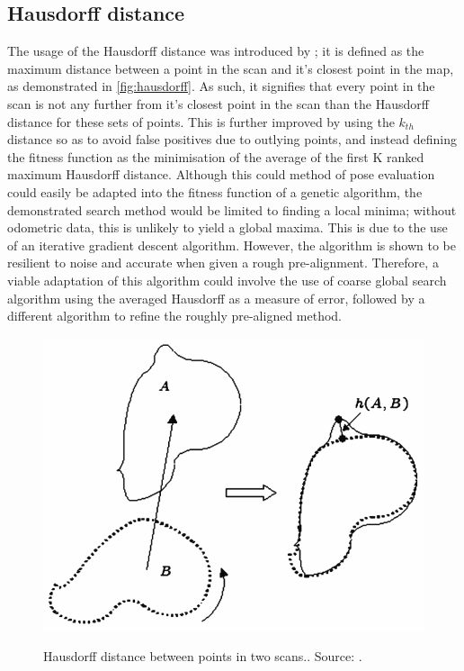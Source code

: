 \documentclass[authoryearcitations]{UoYCSproject}
\begin{document}
\subsection{Hausdorff distance}
The usage of the Hausdorff distance was introduced by \citet{Donoso-Aguirre2008-pb}; it is defined as the maximum distance between a point in the scan and it's closest point in the map, as demonstrated in \autoref{fig:hausdorff}. As such, it signifies that every point in the scan is not any further from it's closest point in the scan than the Hausdorff distance for these sets of points. This is further improved by using the $k_{th}$ distance so as to avoid false positives due to outlying points, and instead defining the fitness function as the minimisation of the average of the first K ranked maximum Hausdorff distance. Although this could method of pose evaluation could easily be adapted into the fitness function of a genetic algorithm, the demonstrated search method would be limited to finding a local minima; without odometric data, this is unlikely to yield a global maxima. This is due to the use of an iterative gradient descent algorithm. However, the algorithm is shown to be resilient to noise and accurate when given a rough pre-alignment. Therefore, a viable adaptation of this algorithm could involve the use of coarse global search algorithm using the averaged Hausdorff as a measure of error, followed by a different algorithm to refine the roughly pre-aligned method.

\begin{figure}[t]
	\centering
	\includegraphics[width=\textwidth,keepaspectratio]{images/hausdorff.png}
	\label{fig:hausdorff}
	\caption{Hausdorff distance between points in two scans.. Source: \citet{Donoso-Aguirre2008-pb}.}
\end{figure}
\end{document}
